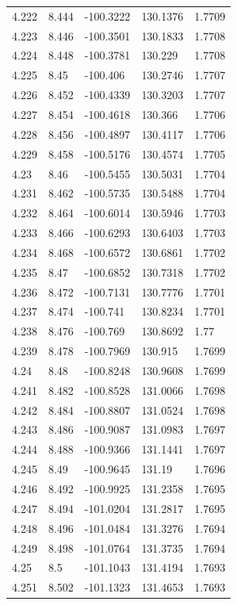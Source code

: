 \begin{tabular}{lllll}
4.222 & 8.444 & -100.3222 & 130.1376 & 1.7709 \\
4.223 & 8.446 & -100.3501 & 130.1833 & 1.7708 \\
4.224 & 8.448 & -100.3781 & 130.229 & 1.7708 \\
4.225 & 8.45 & -100.406 & 130.2746 & 1.7707 \\
4.226 & 8.452 & -100.4339 & 130.3203 & 1.7707 \\
4.227 & 8.454 & -100.4618 & 130.366 & 1.7706 \\
4.228 & 8.456 & -100.4897 & 130.4117 & 1.7706 \\
4.229 & 8.458 & -100.5176 & 130.4574 & 1.7705 \\
4.23 & 8.46 & -100.5455 & 130.5031 & 1.7704 \\
4.231 & 8.462 & -100.5735 & 130.5488 & 1.7704 \\
4.232 & 8.464 & -100.6014 & 130.5946 & 1.7703 \\
4.233 & 8.466 & -100.6293 & 130.6403 & 1.7703 \\
4.234 & 8.468 & -100.6572 & 130.6861 & 1.7702 \\
4.235 & 8.47 & -100.6852 & 130.7318 & 1.7702 \\
4.236 & 8.472 & -100.7131 & 130.7776 & 1.7701 \\
4.237 & 8.474 & -100.741 & 130.8234 & 1.7701 \\
4.238 & 8.476 & -100.769 & 130.8692 & 1.77 \\
4.239 & 8.478 & -100.7969 & 130.915 & 1.7699 \\
4.24 & 8.48 & -100.8248 & 130.9608 & 1.7699 \\
4.241 & 8.482 & -100.8528 & 131.0066 & 1.7698 \\
4.242 & 8.484 & -100.8807 & 131.0524 & 1.7698 \\
4.243 & 8.486 & -100.9087 & 131.0983 & 1.7697 \\
4.244 & 8.488 & -100.9366 & 131.1441 & 1.7697 \\
4.245 & 8.49 & -100.9645 & 131.19 & 1.7696 \\
4.246 & 8.492 & -100.9925 & 131.2358 & 1.7695 \\
4.247 & 8.494 & -101.0204 & 131.2817 & 1.7695 \\
4.248 & 8.496 & -101.0484 & 131.3276 & 1.7694 \\
4.249 & 8.498 & -101.0764 & 131.3735 & 1.7694 \\
4.25 & 8.5 & -101.1043 & 131.4194 & 1.7693 \\
4.251 & 8.502 & -101.1323 & 131.4653 & 1.7693 \\

\end{tabular}
